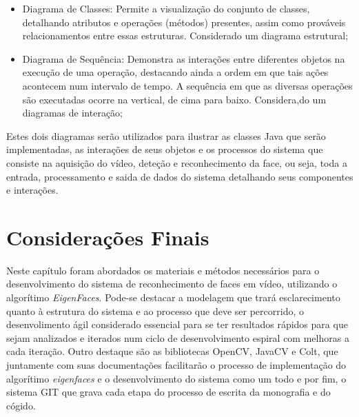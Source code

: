 \begin{itemize}
	\item Diagrama de Classes: Permite a visualização do conjunto de classes, detalhando atributos e operações (métodos) presentes, assim como prováveis relacionamentos entre essas estruturas. Considerado um diagrama estrutural;
	
	\item Diagrama de Sequência: Demonstra as interações entre diferentes objetos na execução de uma operação, destacando ainda a ordem em que tais ações acontecem num intervalo de tempo. A sequência em que as diversas operações são executadas ocorre na vertical, de cima para baixo. Considera,do um diagramas de interação;	
\end{itemize}

Estes dois diagramas serão utilizados para ilustrar as classes Java que serão implementadas, as interações de seus objetos e os processos do sistema que consiste na aquisição do vídeo, deteção e reconhecimento da face, ou seja, toda a entrada, processamento e saida de dados do sistema detalhando seus componentes e interações.

\section{Considerações Finais}\label{sec:consfin}
Neste capítulo foram abordados os materiais e métodos necessários para o desenvolvimento do sistema de reconhecimento de faces em vídeo, utilizando o algorítimo \textit{EigenFaces}. Pode-se destacar a modelagem que trará esclarecimento quanto à estrutura do sistema e ao processo que deve ser percorrido, o desenvolimento ágil considerado essencial para se ter resultados rápidos para que sejam analizados e iterados num ciclo de desenvolvimento espiral com melhoras a cada iteração. Outro destaque são as bibliotecas OpenCV, JavaCV e Colt, que juntamente com suas documentações facilitarão o processo de implementação do algorítimo \textit{eigenfaces} e o desenvolvimento do sistema como um todo e por fim, o sistema GIT que grava cada etapa do processo de escrita da monografia e do cógido.







%





